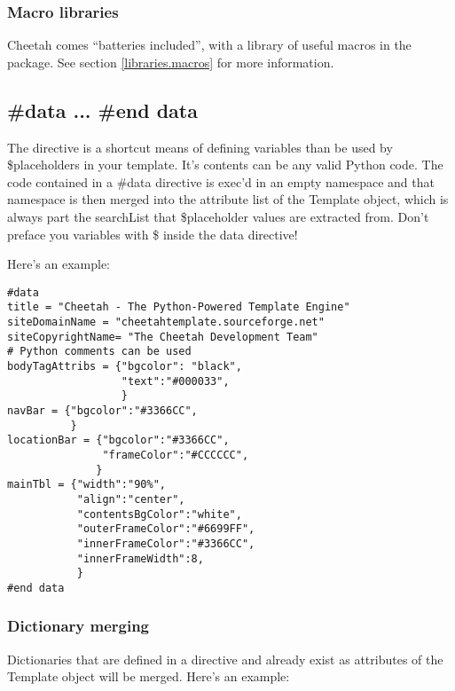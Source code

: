 \subsubsection{Macro libraries}
\label{directives.macros.libraries}

Cheetah comes ``batteries included'', with a library of useful macros in the
 package.  See section \ref{libraries.macros} for more
information.


\subsection{\#data ... \#end data}
\label{directives.data}

The  directive is a shortcut means of defining variables than be
used by \$placeholders in your template. It's contents can be any valid Python
code.  The code contained in a \#data directive is exec'd in an empty namespace
and that namespace is then merged into the attribute list of the Template
object, which is always part the searchList that \$placeholder values are
extracted from.  Don't preface you variables with \$ inside the data directive!

Here's an example:

\begin{verbatim}
#data
title = "Cheetah - The Python-Powered Template Engine"
siteDomainName = "cheetahtemplate.sourceforge.net"
siteCopyrightName= "The Cheetah Development Team" 
# Python comments can be used
bodyTagAttribs = {"bgcolor": "black",
                  "text":"#000033", 
                  }
navBar = {"bgcolor":"#3366CC", 
          }
locationBar = {"bgcolor":"#3366CC",
               "frameColor":"#CCCCCC",
              }
mainTbl = {"width":"90%",
           "align":"center",
           "contentsBgColor":"white",
           "outerFrameColor":"#6699FF", 
           "innerFrameColor":"#3366CC",
           "innerFrameWidth":8,
           }
#end data
\end{verbatim}

\subsubsection{Dictionary merging}

Dictionaries that are defined in a  directive and already exist as
attributes of the Template object will be merged.  Here's an example:

